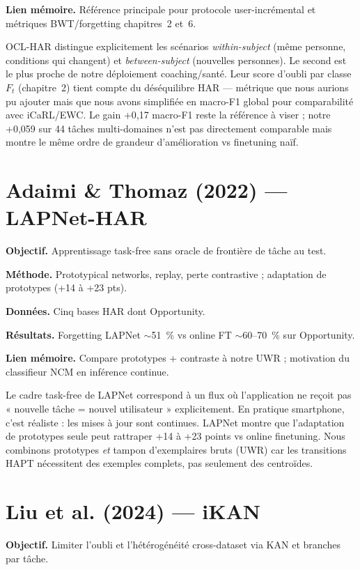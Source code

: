 \documentclass[a4paper,12pt]{report}
\begin{document}
\textbf{Lien mémoire.} Référence principale pour protocole user-incrémental et
métriques BWT/forgetting chapitres~2 et~6.

OCL-HAR distingue explicitement les scénarios \emph{within-subject} (même personne,
conditions qui changent) et \emph{between-subject} (nouvelles personnes). Le second
est le plus proche de notre déploiement coaching/santé. Leur score d'oubli par
classe $F_t$ (chapitre~2) tient compte du déséquilibre HAR — métrique que nous
aurions pu ajouter mais que nous avons simplifiée en macro-F1 global pour
comparabilité avec iCaRL/EWC. Le gain +0,17 macro-F1 reste la référence à viser ;
notre +0,059 sur 44 tâches multi-domaines n'est pas directement comparable mais
montre le même ordre de grandeur d'amélioration vs finetuning naïf.

\section{Adaimi \& Thomaz (2022) — LAPNet-HAR}

\textbf{Objectif.} Apprentissage task-free sans oracle de frontière de tâche au test.

\textbf{Méthode.} Prototypical networks, replay, perte contrastive ; adaptation
de prototypes (+14 à +23 pts).

\textbf{Données.} Cinq bases HAR dont Opportunity.

\textbf{Résultats.} Forgetting LAPNet $\sim$51~\% vs online FT $\sim$60--70~\%
sur Opportunity.

\textbf{Lien mémoire.} Compare prototypes + contraste à notre UWR ; motivation
du classifieur NCM en inférence continue.

Le cadre task-free de LAPNet correspond à un flux où l'application ne reçoit pas
« nouvelle tâche = nouvel utilisateur » explicitement. En pratique smartphone, c'est
réaliste : les mises à jour sont continues. LAPNet montre que l'adaptation de
prototypes seule peut rattraper +14 à +23 points vs online finetuning. Nous
combinons prototypes \emph{et} tampon d'exemplaires bruts (UWR) car les
transitions HAPT nécessitent des exemples complets, pas seulement des centroïdes.

\section{Liu et al. (2024) — iKAN}

\textbf{Objectif.} Limiter l'oubli et l'hétérogénéité cross-dataset via KAN et
branches par tâche.
\end{document}
